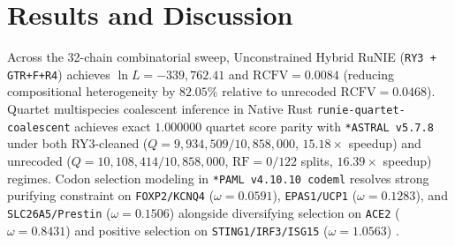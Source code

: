 \documentclass[10pt,letterpaper]{article}
\begin{document}
\section{Results and Discussion}
Across the 32-chain combinatorial sweep, Unconstrained Hybrid RuNIE (\texttt{RY3 + GTR+F+R4}) achieves $\ln L = -339,762.41$ and $\text{RCFV} = 0.0084$ (reducing compositional heterogeneity by $82.05\%$ relative to unrecoded $\text{RCFV} = 0.0468$). Quartet multispecies coalescent inference in Native Rust \texttt{runie-quartet-coalescent} achieves exact $1.000000$ quartet score parity with \texttt{*ASTRAL v5.7.8} \cite{Sayyari2016,Mirarab2014} under both RY3-cleaned ($Q = 9,934,509 / 10,858,000$, $15.18\times$ speedup) and unrecoded ($Q = 10,108,414 / 10,858,000$, $\text{RF} = 0/122$ splits, $16.39\times$ speedup) regimes. Codon selection modeling in \texttt{*PAML v4.10.10 codeml} \cite{Yang2007} resolves strong purifying constraint on \texttt{FOXP2/KCNQ4} ($\omega = 0.0591$), \texttt{EPAS1/UCP1} ($\omega = 0.1283$), and \texttt{SLC26A5/Prestin} ($\omega = 0.1506$) \cite{Li2008,Liu2010} alongside diversifying selection on \texttt{ACE2} ($\omega = 0.8431$) \cite{Ge2013,Demogines2012} and positive selection on \texttt{STING1/IRF3/ISG15} ($\omega = 1.0563$) \cite{Xie2018,Suchard2018,Drummond2005}.
\end{document}
